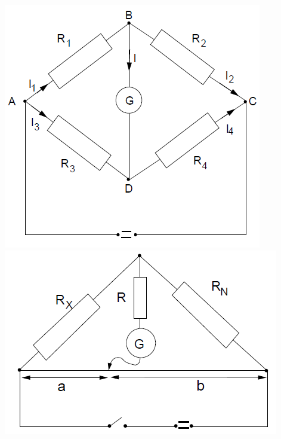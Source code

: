 \documentclass[a4paper,11pt]{article}
\begin{document}
\begin{minipage}[]{0.5\textwidth}    
    \centering
    \includegraphics[scale=0.4]{Obecné zapojení stejnosměrného můstku}
    \captionsetup{justification=centering, font=footnotesize}
    \label{fig:Obecné zapojení stejnosměrného můstku}
    \vspace{30pt}
    \centering
    \includegraphics[scale=0.4]{Můstek s lineárním potenciometrem}
    \captionsetup{justification=centering, font=footnotesize}
    \label{fig:Můstek s lineárním potenciometrem}
\end{minipage}
\newpage
\end{document}
